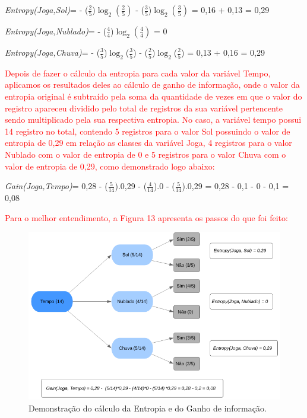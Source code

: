 \textit{Entropy(Joga,Sol)}={ - ($\frac{2}{5}$)$\log_{2}(\frac{2}{5})$ - ($\frac{3}{5}$)$\log_{2}(\frac{3}{5})$ = 0,16 + 0,13 = 0,29}

\textit{Entropy(Joga,Nublado)}={ - ($\frac{4}{4}$)$\log_{2}(\frac{4}{4})$ = 0}

\textit{Entropy(Joga,Chuva)}={ - ($\frac{3}{5}$)$\log_{2}$($\frac{3}{5}$) - ($\frac{2}{5}$)$\log_{2}$($\frac{2}{5}$) = 0,13 + 0,16 = 0,29} 

\par
\textcolor{red}{Depois de fazer o cálculo da entropia para cada valor da variável Tempo, aplicamos os resultados deles ao cálculo de ganho de informação, onde o valor da entropia original é subtraído pela soma da quantidade de vezes em que o valor do registro apareceu dividido pelo total de registros da sua variável pertencente sendo multiplicado pela sua respectiva entropia. No caso, a variável tempo possui 14 registro no total, contendo 5 registros para o valor Sol possuindo o valor de entropia de 0,29 em relação as classes da variável Joga, 4 registros para o valor Nublado com o valor de entropia de 0 e 5 registros para o valor Chuva com o valor de entropia de 0,29, como demonstrado logo abaixo:}

\textit{Gain(Joga,Tempo)}={ 0,28 - ($\frac{5}{14}$).0,29 - ($\frac{4}{14}$).0 - ($\frac{5}{14}$).0,29 = 0,28 - 0,1 - 0 - 0,1 = 0,08} 
\par
\textcolor{red}{Para o melhor entendimento, a Figura 13 apresenta os passos do que foi feito:}

\begin{figure}[!htp]
	\begin{center}
    \caption{\label{fig:waveform_fig} Demonstração do cálculo da Entropia e do Ganho de informação.}
	\includegraphics[scale=0.80]{Figuras/Calculo_ganho_de_informacao.png}
	\end{center}
\end{figure}

